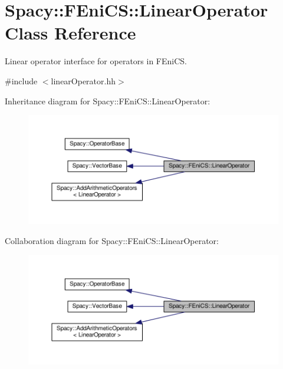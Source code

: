 \hypertarget{classSpacy_1_1FEniCS_1_1LinearOperator}{\section{Spacy\-:\-:F\-Eni\-C\-S\-:\-:Linear\-Operator Class Reference}
\label{classSpacy_1_1FEniCS_1_1LinearOperator}
}


Linear operator interface for operators in F\-Eni\-C\-S.  




{\ttfamily \#include $<$linear\-Operator.\-hh$>$}



Inheritance diagram for Spacy\-:\-:F\-Eni\-C\-S\-:\-:Linear\-Operator\-:
\nopagebreak
\begin{figure}[H]
\begin{center}
\leavevmode
\includegraphics[width=350pt]{classSpacy_1_1FEniCS_1_1LinearOperator__inherit__graph}
\end{center}
\end{figure}


Collaboration diagram for Spacy\-:\-:F\-Eni\-C\-S\-:\-:Linear\-Operator\-:
\nopagebreak
\begin{figure}[H]
\begin{center}
\leavevmode
\includegraphics[width=350pt]{classSpacy_1_1FEniCS_1_1LinearOperator__coll__graph}
\end{center}
\end{figure}
